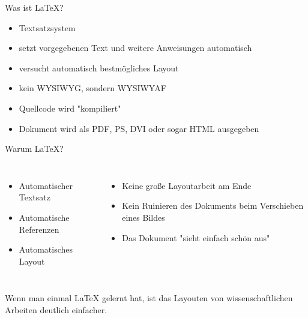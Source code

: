 \documentclass[presentation,aspectratio=169]{beamer}
\begin{document}
\begin{frame}{Was ist \LaTeX?}
  \begin{itemize}
    \item Textsatzsystem
    \item setzt vorgegebenen Text und weitere Anweisungen automatisch
    \item versucht automatisch bestmögliches Layout
    \item kein WYSIWYG, sondern WYSIWYAF
    \item Quellcode wird "kompiliert"
    \item Dokument wird als PDF, PS, DVI oder sogar HTML ausgegeben
  \end{itemize}
\end{frame}

\begin{frame}{Warum \LaTeX?}
  \begin{columns}[t]
      \begin{itemize}
        \item Automatischer Textsatz
        \item Automatische Referenzen
        \item Automatisches Layout
      \end{itemize}
      \begin{itemize}
        \item Keine große Layoutarbeit am Ende
        \item Kein Ruinieren des Dokuments beim Verschieben eines Bildes
        \item Das Dokument "sieht einfach schön aus"
      \end{itemize}
  \end{columns}
  \begin{center}
    Wenn man einmal \LaTeX{} gelernt hat, ist das Layouten von wissenschaftlichen Arbeiten deutlich einfacher.
  \end{center}
\end{frame}
\end{document}
